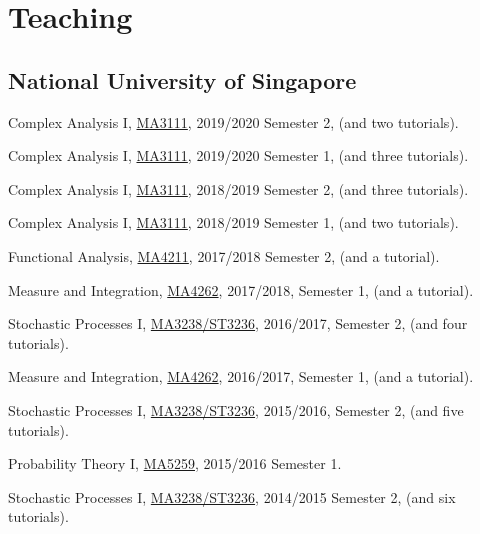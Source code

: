 \documentclass[12pt,a4paper]{article}
\newenvironment{item_list}{
 \begin{list}{}{
   \setlength{\leftmargin}{1.5em}
   \setlength{\itemsep}{0.25em}
   \setlength{\parskip}{0pt}
   \setlength{\parsep}{0.25em}
 }
}{
 \end{list}
}
\begin{document}
\section*{Teaching}

\subsection*{{National University of Singapore}}

\begin{item_list}
\item
  Complex Analysis I, \href{https://wangd-math.github.io/teaching/MA3111_S20/index.html}{MA3111}, 2019/2020 Semester 2, (and two tutorials).
\item
  Complex Analysis I, \href{https://wangd-math.github.io/teaching/MA3111_F19/index.html}{MA3111}, 2019/2020 Semester 1, (and three tutorials).
\item
  Complex Analysis I, \href{https://wangd-math.github.io/teaching/MA3111_S19/index.html}{MA3111}, 2018/2019 Semester 2, (and three tutorials).
\item
  Complex Analysis I, \href{https://wangd-math.github.io/teaching/MA3111_F18/index.html}{MA3111}, 2018/2019 Semester 1, (and two tutorials).
\item
  Functional Analysis, \href{https://wangd-math.github.io/teaching/MA4211_S18/index.html}{MA4211}, 2017/2018 Semester 2, (and a tutorial).
\item
  Measure and Integration, \href{https://wangd-math.github.io/teaching/MA4262_F17/index.html}{MA4262}, 2017/2018, Semester 1, (and a tutorial).
\item
  Stochastic Processes I, \href{https://wangd-math.github.io/teaching/MA3238_ST3236_S17/index.html}{MA3238/ST3236}, 2016/2017, Semester 2, (and four tutorials).
\item
  Measure and Integration, \href{https://wangd-math.github.io/teaching/MA4262_F16/index.html}{MA4262}, 2016/2017, Semester 1, (and a tutorial).
\item
  Stochastic Processes I, \href{https://wangd-math.github.io/teaching/MA3238_ST3236_S16/index.html}{MA3238/ST3236}, 2015/2016, Semester 2, (and five tutorials).
\item
  Probability Theory I, \href{https://wangd-math.github.io/teaching/MA5259_F15/index.html}{MA5259}, 2015/2016 Semester 1.
\item
  Stochastic Processes I, \href{https://wangd-math.github.io/teaching/MA3238_ST3236_S15/index.html}{MA3238/ST3236}, 2014/2015 Semester 2, (and six tutorials).

\end{item_list}
\end{document}
